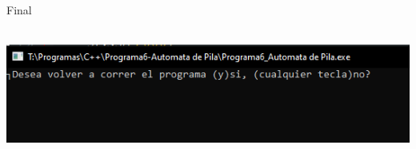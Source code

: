 \documentclass[a4paper]{report}
\begin{document}
\begin{flushleft}
Final
\includegraphics[width= 15cm, height= 5cm]{p6-4.png}



\end{flushleft}
\end{document}
